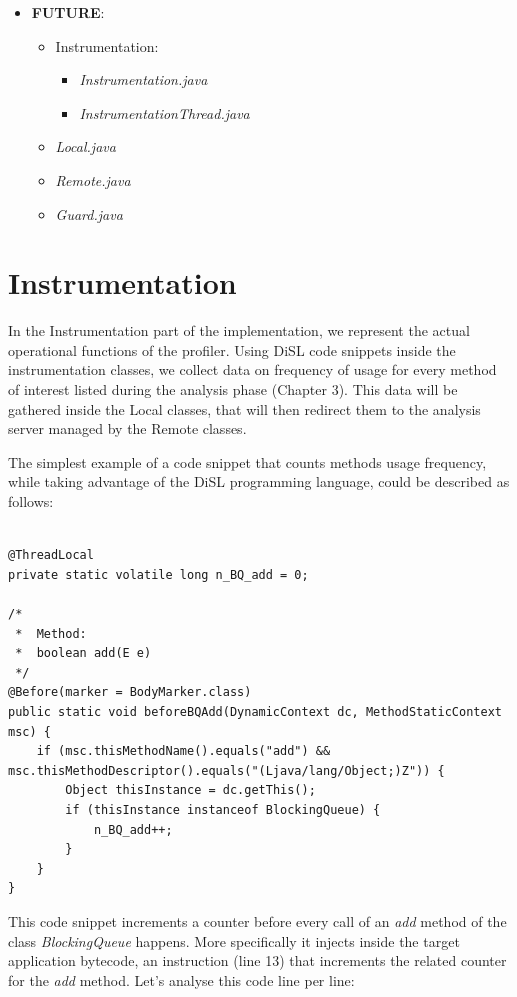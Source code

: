 \documentclass[]{usiinfthesis}
\begin{document}
\begin{itemize}
    \item \textbf{FUTURE}:
    \begin{itemize}
        \item Instrumentation:
        \begin{itemize}
            \item \textit{Instrumentation.java}
            \item \textit{InstrumentationThread.java}
        \end{itemize}
        \item \textit{Local.java}
        \item \textit{Remote.java}
        \item \textit{Guard.java}
    \end{itemize}
\end{itemize}

\large
\section{Instrumentation}
In the Instrumentation part of the implementation, we represent the actual operational functions of the profiler. Using DiSL code snippets inside the instrumentation classes, we collect data on frequency of usage for every method of interest listed during the analysis phase (Chapter 3). This data will be gathered inside the Local classes, that will then redirect them to the analysis server managed by the Remote classes.

\noindent The simplest example of a code snippet that counts methods usage frequency, while taking advantage of the DiSL programming language, could be described as follows:

\vspace*{0.5cm}
\begin{verbatim}

@ThreadLocal
private static volatile long n_BQ_add = 0;

/*
 *  Method:
 *  boolean add(E e)
 */
@Before(marker = BodyMarker.class)
public static void beforeBQAdd(DynamicContext dc, MethodStaticContext msc) {
    if (msc.thisMethodName().equals("add") && msc.thisMethodDescriptor().equals("(Ljava/lang/Object;)Z")) {
        Object thisInstance = dc.getThis();
        if (thisInstance instanceof BlockingQueue) {
            n_BQ_add++;
        }
    }
}
\end{verbatim}
\vspace*{0.5cm}

\noindent
This code snippet increments a counter before every call of an \textit{add} method of the class \textit{BlockingQueue} happens. More specifically it injects inside the target application bytecode, an instruction (line 13) that increments the related counter for the \textit{add} method. Let's analyse this code line per line:
\end{document}

